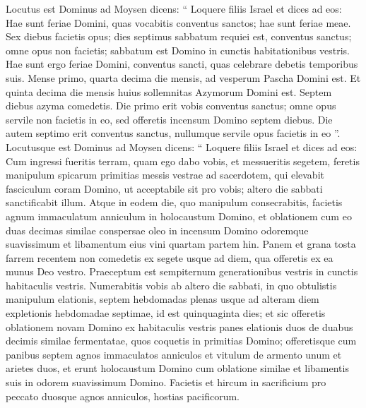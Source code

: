 \begin{biblechapter}
\begin{biblechapter}
\begin{biblechapter}
\begin{biblechapter}
\begin{biblechapter}
\begin{biblechapter}
\begin{biblechapter}
\begin{biblechapter}
\begin{biblechapter}
\begin{biblechapter}
\begin{biblechapter}
\begin{biblechapter}
\begin{biblechapter}
\begin{biblechapter}
\begin{biblechapter}
\begin{biblechapter}
\begin{biblechapter}
\begin{biblechapter}
\begin{biblechapter}
\begin{biblechapter}
\begin{biblechapter}
\begin{biblechapter}
\begin{biblechapter}
\verse Locutus est Dominus ad Moysen dicens: 
\verse “ Loquere filiis Israel et dices ad eos: Hae sunt feriae Domini, quas vocabitis conventus sanctos; hae sunt feriae meae.
 \verse Sex diebus facietis opus; dies septimus sabbatum requiei est, conventus sanctus; omne opus non facietis; sabbatum est Domino in cunctis habitationibus vestris.
 \verse Hae sunt ergo feriae Domini, conventus sancti, quas celebrare debetis temporibus suis.
 \verse Mense primo, quarta decima die mensis, ad vesperum Pascha Domini est. 
\verse Et quinta decima die mensis huius sollemnitas Azymorum Domini est. Septem diebus azyma comedetis. 
\verse Die primo erit vobis conventus sanctus; omne opus servile non facietis in eo, 
\verse sed offeretis incensum Domino septem diebus. Die autem septimo erit conventus sanctus, nullumque servile opus facietis in eo ”.
 \verse Locutusque est Dominus ad Moysen dicens: 
\verse “ Loquere filiis Israel et dices ad eos: Cum ingressi fueritis terram, quam ego dabo vobis, et messueritis segetem, feretis manipulum spicarum primitias messis vestrae ad sacerdotem, 
 \verse qui elevabit fasciculum coram Domino, ut acceptabile sit pro vobis; altero die sabbati sanctificabit illum. 
\verse Atque in eodem die, quo manipulum consecrabitis, facietis agnum immaculatum anniculum in holocaustum Domino, 
 \verse et oblationem cum eo duas decimas similae conspersae oleo in incensum Domino odoremque suavissimum et libamentum eius vini quartam partem hin. 
\verse Panem et grana tosta farrem recentem non comedetis ex segete usque ad diem, qua offeretis ex ea munus Deo vestro. Praeceptum est sempiternum generationibus vestris in cunctis habitaculis vestris.
 \verse Numerabitis vobis ab altero die sabbati, in quo obtulistis manipulum elationis, septem hebdomadas plenas 
\verse usque ad alteram diem expletionis hebdomadae septimae, id est quinquaginta dies; et sic offeretis oblationem novam Domino 
\verse ex habitaculis vestris panes elationis duos de duabus decimis similae fermentatae, quos coquetis in primitias Domino; 
\verse offeretisque cum panibus septem agnos immaculatos anniculos et vitulum de armento unum et arietes duos, et erunt holocaustum Domino cum oblatione similae et libamentis suis in odorem suavissimum Domino. 
\verse Facietis et hircum in sacrificium pro peccato duosque agnos anniculos, hostias pacificorum. 

\end{biblechapter}
\end{biblechapter}
\end{biblechapter}
\end{biblechapter}
\end{biblechapter}
\end{biblechapter}
\end{biblechapter}
\end{biblechapter}
\end{biblechapter}
\end{biblechapter}
\end{biblechapter}
\end{biblechapter}
\end{biblechapter}
\end{biblechapter}
\end{biblechapter}
\end{biblechapter}
\end{biblechapter}
\end{biblechapter}
\end{biblechapter}
\end{biblechapter}
\end{biblechapter}
\end{biblechapter}
\end{biblechapter}
